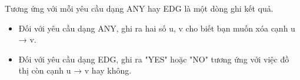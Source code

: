 Tương ứng với mỗi yêu cầu dạng ANY hay EDG là một dòng ghi kết quả.  
\begin{itemize}
	\item     Đối với yêu cầu dạng ANY, ghi ra hai số u, v cho biết bạn muốn xóa cạnh u → v.   
	\item     Đối với yêu cầu dạng EDG, ghi ra "YES" hoặc "NO" tương ứng với việc đồ thị còn cạnh u → v hay không.   
\end{itemize}

\